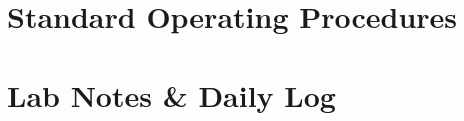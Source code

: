 \documentclass[twoside]{article}
\begin{document}
	
	\newcommand{\HRule}{\rule{\linewidth}{0.5mm}}
	
	\newcommand{\e}[1]{\ensuremath{\times 10^{#1}}}

	\pagestyle{style1}
	
	\setcounter{page}{1}
	

	\part{Standard Operating Procedures}
	

	\clearpage
	\pagestyle{style2}
	\part{Lab Notes \& Daily Log}
	
\end{document}
